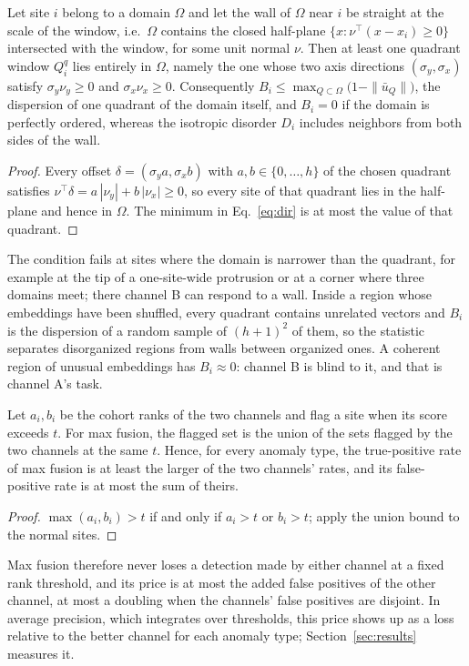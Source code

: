 \begin{proposition}
\label{prop:wall}
Let site $i$ belong to a domain $\Omega$ and let the wall of $\Omega$ near $i$ be straight at the scale of the window, i.e.\ $\Omega$ contains the closed half-plane $\{x:\nu^{\top}(x-x_i)\ge0\}$ intersected with the window, for some unit normal $\nu$. Then at least one quadrant window $Q_i^q$ lies entirely in $\Omega$, namely the one whose two axis directions $(\sigma_y,\sigma_x)$ satisfy $\sigma_y\nu_y\ge0$ and $\sigma_x\nu_x\ge0$. Consequently $B_i\le\max_{Q\subset\Omega}\bigl(1-\|\bar u_Q\|\bigr)$, the dispersion of one quadrant of the domain itself, and $B_i=0$ if the domain is perfectly ordered, whereas the isotropic disorder $D_i$ includes neighbors from both sides of the wall.
\end{proposition}
\begin{proof}
Every offset $\delta=(\sigma_y a,\sigma_x b)$ with $a,b\in\{0,\dots,h\}$ of the chosen quadrant satisfies $\nu^{\top}\delta=a\,|\nu_y|+b\,|\nu_x|\ge0$, so every site of that quadrant lies in the half-plane and hence in $\Omega$. The minimum in Eq.~\eqref{eq:dir} is at most the value of that quadrant.
\end{proof}
The condition fails at sites where the domain is narrower than the quadrant, for example at the tip of a one-site-wide protrusion or at a corner where three domains meet; there channel B can respond to a wall. Inside a region whose embeddings have been shuffled, every quadrant contains unrelated vectors and $B_i$ is the dispersion of a random sample of $(h+1)^2$ of them, so the statistic separates disorganized regions from walls between organized ones. A coherent region of unusual embeddings has $B_i\approx0$: channel B is blind to it, and that is channel A's task.

\begin{proposition}
\label{prop:fuse}
Let $a_i,b_i$ be the cohort ranks of the two channels and flag a site when its score exceeds $t$. For max fusion, the flagged set is the union of the sets flagged by the two channels at the same $t$. Hence, for every anomaly type, the true-positive rate of max fusion is at least the larger of the two channels' rates, and its false-positive rate is at most the sum of theirs.
\end{proposition}
\begin{proof}
$\max(a_i,b_i)>t$ if and only if $a_i>t$ or $b_i>t$; apply the union bound to the normal sites.
\end{proof}
Max fusion therefore never loses a detection made by either channel at a fixed rank threshold, and its price is at most the added false positives of the other channel, at most a doubling when the channels' false positives are disjoint. In average precision, which integrates over thresholds, this price shows up as a loss relative to the better channel for each anomaly type; Section~\ref{sec:results} measures it.

